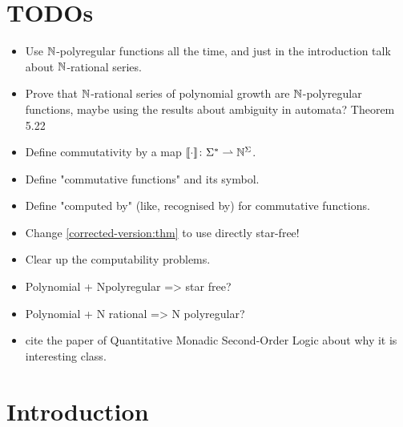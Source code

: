 \documentclass[sigconf,natbib=false,screen, review,anonymous]{acmart}
\begin{document}
\maketitle
\acknowledge

\section{TODOs}

\begin{itemize}
    \item Use $\mathbb{N}$-polyregular functions all the time, and just 
        in the introduction talk about $\mathbb{N}$-rational series.
    \item Prove that $\mathbb{N}$-rational series of polynomial 
        growth are $\mathbb{N}$-polyregular functions, maybe using
        the results about ambiguity in automata?
        Theorem 5.22
    \item Define commutativity by a map 
        $\commute \colon \Sigma^* \topartial \Nat^{\Sigma}$.
    \item Define "commutative functions" and its symbol.
    \item Define "computed by" (like, recognised by) for commutative 
        functions.
    \item Change \cref{corrected-version:thm} to use directly
        star-free!
    \item Clear up the computability problems.
    \item Polynomial + Npolyregular => star free?
    \item Polynomial + N rational => N polyregular?
    \item cite the paper of Quantitative Monadic Second-Order Logic
        about why it is interesting class.
\end{itemize}


\section{Introduction}
\end{document}
